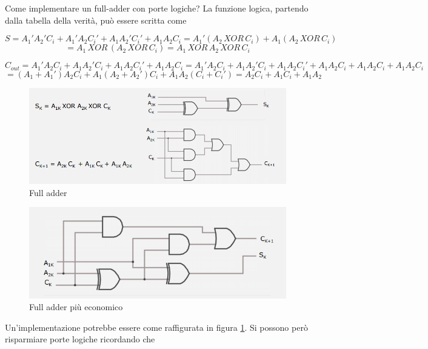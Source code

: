 \documentclass{article}
\begin{document}
\vspace{3mm}

Come implementare un full-adder con porte logiche? La funzione logica, partendo dalla tabella della verità, può essere scritta come

\[S = A_1' A_2' C_i + A_1' A_2 C_i' + A_1 A_2' C_i' + A_1 A_2 C_i = A_1' (A_2 \, XOR \, C_i) + A_1 (A_2 \, XOR \, C_i)\]
\[= A_1 \, XOR \, (A_2 \, XOR \, C_i) = A_1 \, XOR \, A_2 \, XOR \, C_i\]

\[C_{out} = A_1' A_2 C_i + A_1 A_2' C_i + A_1 A_2 C_i' + A_1 A_2 C_i = A_1' A_2 C_i + A_1 A_2' C_i + A_1 A_2 C_i' + A_1 A_2 C_i + A_1 A_2 C_i + A_1 A_2 C_i\]
\[= (A_1 + A_1')A_2 C_i + A_1(A_2 + A_2')C_i + A_1 A_2 (C_i + C_i') = A_2 C_i + A_1 C_i + A_1 A_2\]

\begin{figure}[h]
  \centering
  \includegraphics[scale=0.6]{IM_full_adder}
  \caption{Full adder}
  \label{full_adder}
\end{figure}

\begin{figure}[h]
  \centering
  \includegraphics[scale=0.6]{IM_full_adder_bis}
  \caption{Full adder più economico}
  \label{full_adder_bis}
\end{figure}

Un'implementazione potrebbe essere come raffigurata in figura \ref{full_adder}. Si possono però risparmiare porte logiche ricordando che 
\end{document}
